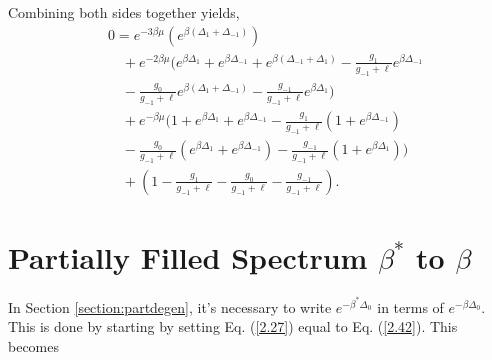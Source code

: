 Combining both sides together yields,
\begin{align}
    &0=e^{-3\beta\mu}(e^{\beta(\Delta_1+\Delta_{-1})})\nonumber\\
    &\quad+e^{-2\beta\mu}(e^{\beta\Delta_1}+e^{\beta\Delta_{-1}}+e^{\beta(\Delta_{-1}+\Delta_1)}-\frac{g_1}{g_{-1}+\ell}e^{\beta\Delta_{-1}}\nonumber\\
    &\quad-\frac{g_0}{g_{-1}+\ell}e^{\beta(\Delta_1+\Delta_{-1})}-\frac{g_{-1}}{g_{-1}+\ell}e^{\beta\Delta_1})\nonumber\\
    &\quad+e^{-\beta\mu}(1+e^{\beta\Delta_1}+e^{\beta\Delta_{-1}}-\frac{g_1}{g_{-1}+\ell}(1+e^{\beta\Delta_{-1}})\nonumber\\
    &\quad-\frac{g_0}{g_{-1}+\ell}(e^{\beta\Delta_1}+e^{\beta\Delta_{-1}})-\frac{g_{-1}}{g_{-1}+\ell}(1+e^{\beta\Delta_1}))\nonumber\\
    &\quad+(1-\frac{g_1}{g_{-1}+\ell}-\frac{g_0}{g_{-1}+\ell}-\frac{g_{-1}}{g_{-1}+\ell}).
\end{align}

\section{Partially Filled Spectrum $\beta^*$ to $\beta$}\label{section:c3}
In Section \ref{section:partdegen}, it's necessary to write $e^{-\beta^*\Delta_0}$ in terms of $e^{-\beta\Delta_0}$. This is done by starting by setting Eq. (\ref{2.27}) equal to Eq. (\ref{2.42}). This becomes

